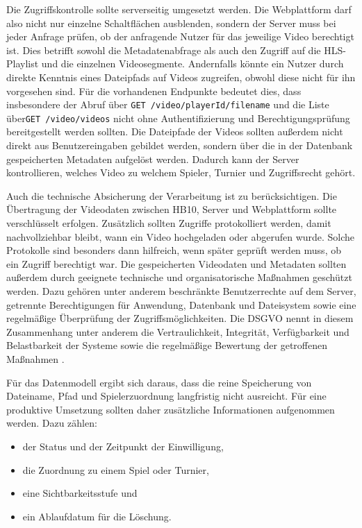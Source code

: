 Die Zugriffskontrolle sollte serverseitig umgesetzt werden. Die Webplattform darf also nicht nur einzelne Schaltflächen ausblenden, sondern der Server muss bei jeder Anfrage prüfen, ob der anfragende Nutzer für das jeweilige Video berechtigt ist. 
Dies betrifft sowohl die Metadatenabfrage als auch den Zugriff auf die HLS-Playlist und die einzelnen Videosegmente. Andernfalls könnte ein Nutzer durch direkte Kenntnis eines Dateipfads auf Videos zugreifen, obwohl diese nicht für ihn vorgesehen sind. 
Für die vorhandenen Endpunkte bedeutet dies, dass insbesondere der Abruf über \texttt{GET /video/playerId/filename} und die Liste über\texttt{GET /video/videos} nicht ohne Authentifizierung und Berechtigungsprüfung bereitgestellt werden sollten. 
Die Dateipfade der Videos sollten außerdem nicht direkt aus Benutzereingaben gebildet werden, sondern über die in der Datenbank gespeicherten Metadaten aufgelöst werden. Dadurch kann der Server kontrollieren, welches Video zu welchem Spieler, Turnier und Zugriffsrecht gehört. 

Auch die technische Absicherung der Verarbeitung ist zu berücksichtigen. Die Übertragung der Videodaten zwischen HB10, Server und Webplattform sollte verschlüsselt erfolgen. Zusätzlich sollten Zugriffe protokolliert werden, 
damit nachvollziehbar bleibt, wann ein Video hochgeladen oder abgerufen wurde. Solche Protokolle sind besonders dann hilfreich, wenn später geprüft werden muss, ob ein Zugriff berechtigt war.
Die gespeicherten Videodaten und Metadaten sollten außerdem durch geeignete technische und organisatorische Maßnahmen geschützt werden. Dazu gehören unter anderem beschränkte Benutzerrechte auf dem Server, getrennte Berechtigungen für Anwendung, 
Datenbank und Dateisystem sowie eine regelmäßige Überprüfung der Zugriffsmöglichkeiten. Die DSGVO nennt in diesem Zusammenhang unter anderem die Vertraulichkeit, Integrität, Verfügbarkeit und Belastbarkeit der Systeme sowie die regelmäßige Bewertung der getroffenen Maßnahmen \cite{eu2016gdpr}. 

Für das Datenmodell ergibt sich daraus, dass die reine Speicherung von Dateiname, Pfad und Spielerzuordnung langfristig nicht ausreicht. Für eine produktive Umsetzung sollten daher zusätzliche Informationen aufgenommen werden. Dazu zählen: 

\begin{itemize} 
    \item der Status und der Zeitpunkt der Einwilligung, 
    \item die Zuordnung zu einem Spiel oder Turnier, 
    \item eine Sichtbarkeitsstufe und 
    \item ein Ablaufdatum für die Löschung. 
\end{itemize} 

